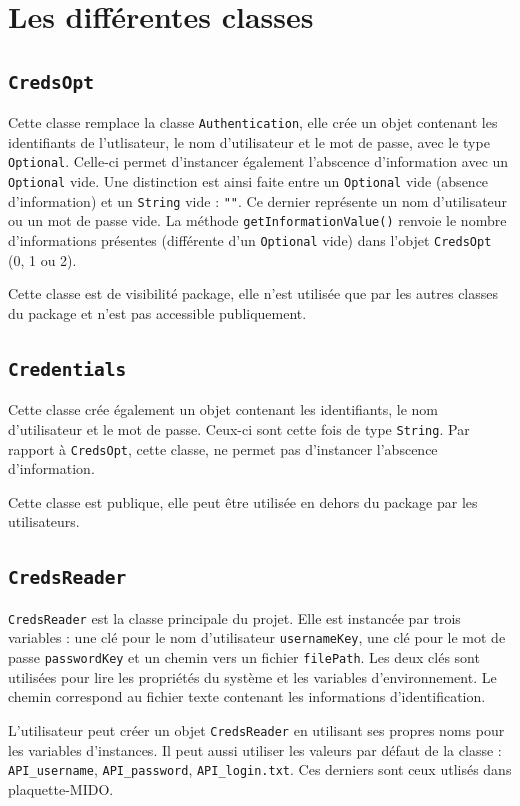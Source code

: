 \section{Les différentes classes}

\subsection{\texttt{CredsOpt}}
Cette classe remplace la classe \texttt{Authentication}, elle crée un objet contenant les identifiants de l'utlisateur, le nom d'utilisateur et le mot de passe, avec le type \texttt{Optional}. Celle-ci permet d'instancer également l'abscence d'information avec un \texttt{Optional} vide. Une distinction est ainsi faite entre un \texttt{Optional} vide (absence d'information) et un \texttt{String} vide : \texttt{""}. Ce dernier représente un nom d'utilisateur ou un mot de passe vide. La méthode \texttt{getInformationValue()} renvoie le nombre d'informations présentes (différente d'un \texttt{Optional} vide) dans l'objet \texttt{CredsOpt} (0, 1 ou 2).

Cette classe est de visibilité package, elle n'est utilisée que par les autres classes du package et n'est pas accessible publiquement.

\subsection{\texttt{Credentials}}
Cette classe crée également un objet contenant les identifiants, le nom d'utilisateur et le mot de passe. Ceux-ci sont cette fois de type \texttt{String}. Par rapport à \texttt{CredsOpt}, cette classe, ne permet pas d'instancer l'abscence d'information. 

Cette classe est publique, elle peut être utilisée en dehors du package par les utilisateurs.

\subsection{\texttt{CredsReader}}
\texttt{CredsReader} est la classe principale du projet. Elle est instancée par trois variables : une clé pour le nom d'utilisateur \texttt{usernameKey}, une clé pour le mot de passe \texttt{passwordKey} et un chemin vers un fichier \texttt{filePath}. Les deux clés sont utilisées pour lire les propriétés du système et les variables d'environnement. Le chemin correspond au fichier texte contenant les informations d'identification.

L'utilisateur peut créer un objet \texttt{CredsReader} en utilisant ses propres noms pour les variables d'instances. Il peut aussi utiliser les valeurs par défaut de la classe : \texttt{API\_username}, \texttt{API\_password}, \texttt{API\_login.txt}. Ces derniers sont ceux utlisés dans plaquette-MIDO.

